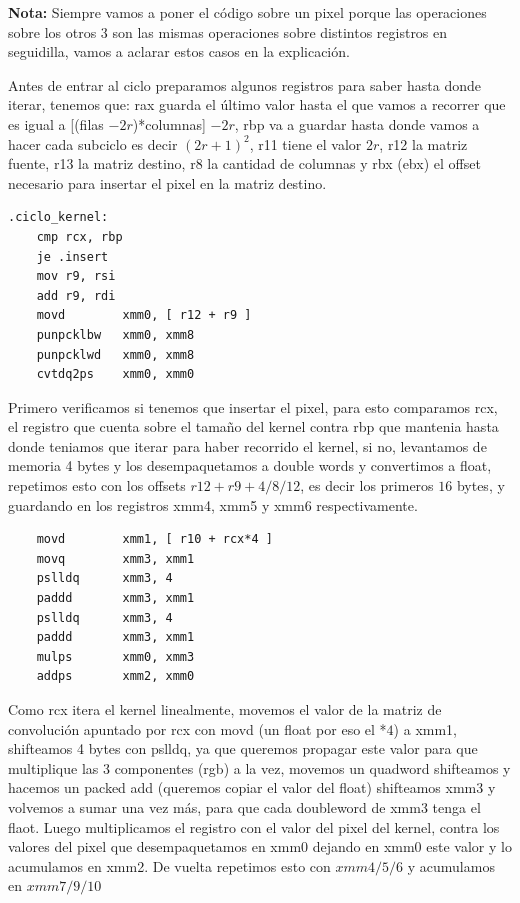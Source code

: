 \documentclass[a4paper]{article}
\begin{document}
\noindent \textbf{Nota:} Siempre vamos a poner el código sobre un pixel porque las operaciones sobre los otros 3 son las mismas operaciones sobre distintos registros en seguidilla, vamos a aclarar estos casos en la explicación.
\newline

 Antes de entrar al ciclo preparamos algunos registros para saber hasta donde iterar, tenemos que: rax guarda el último valor hasta el que vamos a recorrer que es igual a  [(filas $- 2r$)*columnas] $-2r$, rbp va a guardar hasta donde vamos a hacer cada subciclo es decir $(2r+1)^2$, r11 tiene el valor $2r$, r12 la matriz fuente, r13 la matriz destino, r8 la cantidad de columnas y rbx (ebx) el offset necesario para insertar el pixel en la matriz destino.
\begin{codesnippet}
\begin{verbatim}
.ciclo_kernel:
    cmp rcx, rbp                      
    je .insert          
    mov r9, rsi
    add r9, rdi
    movd        xmm0, [ r12 + r9 ]      
    punpcklbw   xmm0, xmm8              
    punpcklwd   xmm0, xmm8              
    cvtdq2ps    xmm0, xmm0    
\end{verbatim}
\end{codesnippet}

 Primero verificamos si tenemos que insertar el pixel, para esto comparamos rcx, el registro que cuenta sobre el tamaño del kernel contra rbp que mantenia hasta donde teniamos que iterar para haber recorrido el kernel, si no, levantamos de memoria 4 bytes y los desempaquetamos a double words y convertimos a float, repetimos esto con los offsets $r12 + r9 + 4/8/12$, es decir los primeros $16$ bytes, y guardando en los registros xmm4, xmm5 y xmm6 respectivamente.
\begin{codesnippet}
\begin{verbatim}    
    movd        xmm1, [ r10 + rcx*4 ]   
    movq        xmm3, xmm1              
    pslldq      xmm3, 4
    paddd       xmm3, xmm1              
    pslldq      xmm3, 4
    paddd       xmm3, xmm1                           
    mulps       xmm0, xmm3              
    addps       xmm2, xmm0              

\end{verbatim}
\end{codesnippet}

Como rcx itera el kernel linealmente, movemos el valor de la matriz de convolución apuntado por rcx con movd (un float por eso el *$4$) a xmm1, shifteamos 4 bytes con pslldq, ya que queremos propagar este valor para que multiplique las 3 componentes (rgb) a la vez, movemos un quadword shifteamos y hacemos un packed add (queremos copiar el valor del float) shifteamos xmm3 y volvemos a sumar una vez más, para que cada doubleword de xmm3 tenga el flaot. Luego multiplicamos el registro con el valor del pixel del kernel, contra los valores del pixel que desempaquetamos en xmm0 dejando en xmm0 este valor y lo acumulamos en xmm2. De vuelta repetimos esto con $xmm4/5/6$ y acumulamos en $xmm7/9/10$
\end{document}

